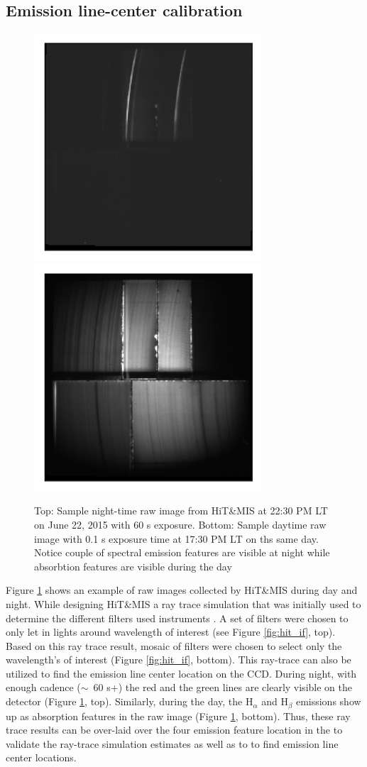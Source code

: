 \documentclass[crop=false,class=mitthesis,oneside,font=12pt]{standalone}
\begin{document}
\subsection{Emission line-center calibration}
\begin{figure}[H]
	\centering\includegraphics[width=20pc]{night_raw.png}
    \centering\includegraphics[width=20pc]{day_raw.png}
	\caption{Top: Sample night-time raw image from HiT\&MIS at 22:30 PM LT on June 22, 2015 with 60 s exposure. Bottom: Sample daytime raw image with 0.1 s exposure time at 17:30 PM LT on ths same day. Notice couple of spectral emission features are visible at night while absorbtion features are visible during the day}
	\label{fig:raw_1}
\end{figure}
%
Figure \ref{fig:raw_1} shows an example of raw images collected by HiT\&MIS during day and night. While designing HiT\&MIS a ray trace simulation that was initially used to determine the different filters used instruments \citep{hitmis}. A set of filters were chosen to only let in lights around wavelength of interest (see Figure \ref{fig:hit_if}, top). Based on this ray trace result, mosaic of filters were chosen to select only the wavelength's of interest (Figure \ref{fig:hit_if}, bottom). This ray-trace can also be utilized to find the emission line center location on the CCD. During night, with enough cadence ($\sim$~60 s+) the red and the green lines are clearly visible on the detector (Figure \ref{fig:raw_1}, top). Similarly, during the day, the H$_\alpha$ and H$_\beta$ emissions show up as absorption features in the raw image (Figure \ref{fig:raw_1}, bottom). Thus, these ray trace results can be over-laid over the four emission feature location in the to validate the ray-trace simulation estimates as well as to to find emission line center locations. 
\end{document}
